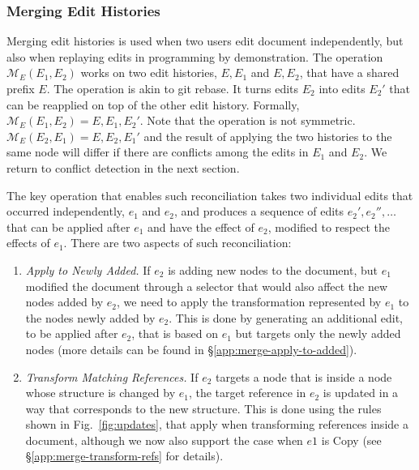 \documentclass[sigconf,anonymous,screen]{acmart}
\newcommand{\ident}[1]{{\sffamily #1}}
\newcommand{\note}[1]{\textcolor{red}{#1}}
\begin{document}

\subsubsection*{Merging Edit Histories}
Merging edit histories is used when two users edit document independently, but also
when replaying edits in programming by demonstration. The operation $\mathcal{M}_E(E_1, E_2)$
works on two edit histories, $E, E_1$ and $E, E_2$, that have a shared prefix $E$.
The operation is akin to git rebase. It turns edits $E_2$ into edits $E_2'$ that can be reapplied
on top of the other edit history. Formally, $\mathcal{M}_E(E_1, E_2) = E, E_1, E_2'$.
Note that the operation is not symmetric. $\mathcal{M}_E(E_2, E_1) = E, E_2, E_1'$ and the
result of applying the two histories to the same node will differ if there are conflicts
among the edits in $E_1$ and $E_2$. We return to conflict detection in the next section.


The key operation that enables such reconciliation takes two individual edits that occurred
independently, $e_1$ and $e_2$, and produces a sequence of edits $e_2', e_2'', \ldots$ that
can be applied after $e_1$ and have the effect of $e_2$, modified to respect the effects of $e_1$.
There are two aspects of such reconciliation:

\begin{enumerate}
\item \emph{Apply to Newly Added.} If $e_2$ is adding new nodes to the document, but
  $e_1$ modified the document through a selector that would also affect the new nodes added by $e_2$,
  we need to apply the transformation represented by $e_1$ to the nodes newly added by $e_2$.
  This is done by generating an additional edit, to be applied after $e_2$, that is based on
  $e_1$ but targets only the newly added nodes (more details can be found in \S\ref{app:merge-apply-to-added}).

\item \emph{Transform Matching References.} If $e_2$ targets a node that is inside a node
  whose structure is changed by $e_1$, the target reference in $e_2$ is updated in a way that
  corresponds to the new structure. This is done using the rules shown in Fig.~\ref{fig:updates},
  that apply when transforming references inside a document, although we now also support the case
  when $e1$ is \ident{Copy} (see \S\ref{app:merge-transform-refs} for details).
\end{enumerate}
\end{document}
